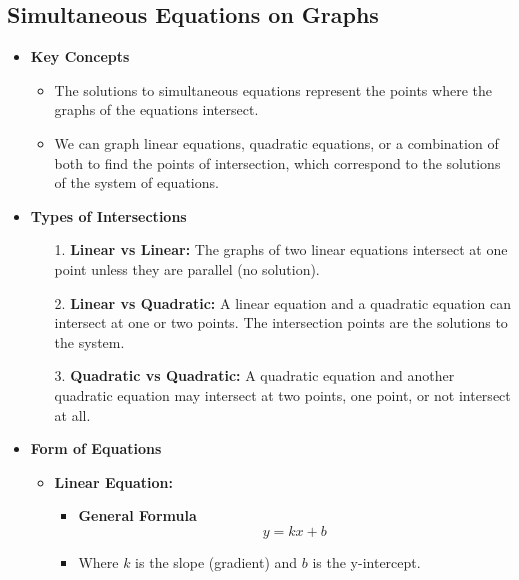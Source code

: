 
\subsection{Simultaneous Equations on Graphs}
\begin{itemize}
    \item \textbf{Key Concepts}
    \begin{itemize}
        \item The solutions to simultaneous equations represent the points where the graphs of the equations intersect.
        \item We can graph linear equations, quadratic equations, or a combination of both to find the points of intersection,
        which correspond to the solutions of the system of equations.
    \end{itemize}
    \item \textbf{Types of Intersections}
    \begin{itemize}
        \item[1.] \textbf{Linear vs Linear:} The graphs of two linear equations intersect at one point unless they are parallel
        (no solution).
        \item[2.] \textbf{Linear vs Quadratic:} A linear equation and a quadratic equation can intersect at one or two points. The
        intersection points are the solutions to the system.
        \item[3.] \textbf{Quadratic vs Quadratic:} A quadratic equation and another quadratic equation may intersect at two
        points, one point, or not intersect at all.
    \end{itemize}
    \item \textbf{Form of Equations}
    \begin{itemize}
        \item \textbf{Linear Equation:}
        \begin{itemize}
            \item \textbf{General Formula}
            \begin{equation}
                y = kx + b
            \end{equation}
            \item Where $k$ is the slope (gradient) and $b$ is the y-intercept.
        \end{itemize}

\end{itemize}
\end{itemize}
